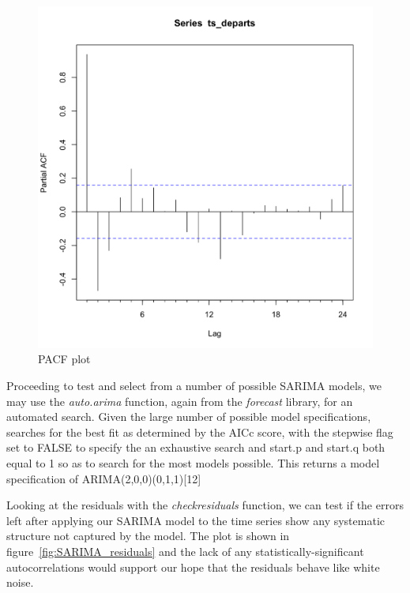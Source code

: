 \documentclass[conference]{IEEEtran}
\begin{document}
\begin{figure}[htbp]
\centerline{\includegraphics[scale=0.25]{Pacf.png}}
\caption{PACF plot}
\label{fig:Pacf}
\end{figure}

Proceeding to test and select from a number of possible SARIMA models, we may use the \textit{auto.arima} function, again from the \textit{forecast} library, for an automated search.  Given the large number of possible model specifications, searches for the best fit as determined by the AICc score, with the stepwise flag set to FALSE to specify the an exhaustive search and start.p and start.q both equal to 1 so as to search for the most models possible.  This returns a model specification of ARIMA(2,0,0)(0,1,1)[12]  

Looking at the residuals with the \textit{checkresiduals} function, we can test if the errors left after applying our SARIMA model to the time series show any systematic structure not captured by the model.  The plot is shown in figure~\ref{fig:SARIMA_residuals} and the lack of any statistically-significant autocorrelations would support our hope that the residuals behave like white noise. 
\end{document}
